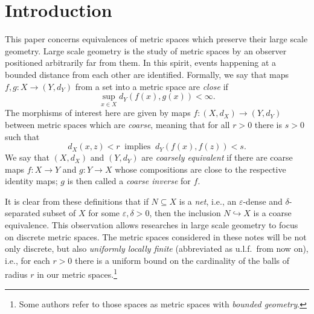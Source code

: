 \documentclass[11pt]{amsart}
\newcommand{\eps}{\varepsilon}
\numberwithin{equation}{section}
\theoremstyle{definition}
\theoremstyle{remark}
\numberwithin{equation}{section}
\begin{document}
\section{Introduction}

This paper concerns equivalences of metric spaces which preserve their large scale geometry. Large scale geometry is the study of metric spaces by an observer positioned arbitrarily far from them. In this spirit, events happening at a bounded distance from each other are identified. Formally, we say that maps $f,g\colon X\to (Y,d_Y)$ from a set into  a metric space are \emph{close} if 
\[\sup_{x\in X}d_Y(f(x),g(x))<\infty.\]
The morphisms of interest here are given by     maps $f\colon (X,d_X)\to (Y,d_Y)$ between metric spaces which are \emph{coarse}, meaning that   for all $r>0$ there is $s>0$ such that 
\[d_X(x,z)<r\ \text{ implies }\ d_Y(f(x),f(z))<s.\]
We say that  $(X,d_X)$ and $(Y,d_Y)$ are \emph{coarsely equivalent} if there are coarse maps $f\colon X\to Y$ and $g\colon Y\to X$ whose compositions are close to the respective identity maps; $g$ is then called a \emph{coarse inverse} for $f$.  

It is clear from these definitions that if $N\subseteq X$ is a \emph{net}, i.e., an $\eps$-dense and $\delta$-separated subset of $X$ for some $\eps,\delta>0$, then the inclusion $N\hookrightarrow X $ is a coarse equivalence.  This observation allows researches in  large scale geometry  to focus on  discrete metric spaces.   The metric spaces considered in these notes will be not only discrete, but also \emph{uniformly locally finite} (abbreviated as u.l.f.\ from now on), i.e.,  for each $r>0$ there is a uniform bound on the cardinality of the balls of radius $r$ in our metric spaces.\footnote{Some authors refer to those spaces as metric spaces with \emph{bounded geometry}.} 
\end{document}

